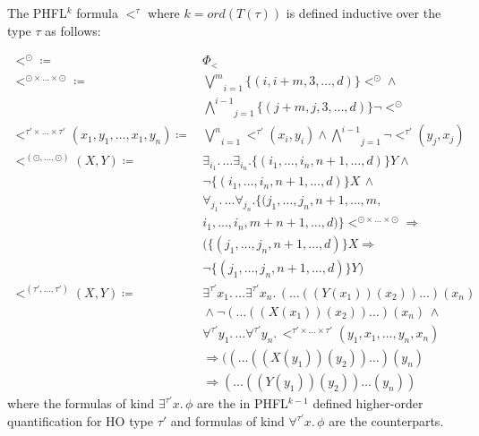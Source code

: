 \begin{definition}
    \label{definition:lower_bound_less}
    The PHFL$^k$ formula $<^\tau$ where $k = ord(T(\tau))$ is defined inductive over the type $\tau$ as follows:

    \begin{align*}
        <^\odot \coloneqq &\,\Phi_< \\
        <^{\odot \times \dots \times \odot} \coloneqq &\,\underset{i = 1}{\overset{m}{\bigvee}}\{(i, i + m, 3, \dots,
        d)\} <^\odot \wedge \\
        &\,\underset{j = 1}{\overset{i - 1}{\bigwedge}}\{(j + m, j, 3, \dots, d)\} \neg
        <^\odot\\
        <^{\tau' \times \dots \times \tau'}(x_1, y_1, \dots, x_1, y_n) \coloneqq &\,\underset{i =
        1}{\overset{n}{\bigvee}}<^{\tau'}(x_i, y_i) \wedge \underset{j = 1}{\overset{i - 1}{\bigwedge}}
        \neg <^{\tau'}(y_j, x_j)\\
        <^{(\odot, \dots, \odot)}(X, Y) \coloneqq &\,\exists_{i_1}.\, \dots \exists_{i_n}. \{(i_1, \dots, i_n, n
        + 1, \dots, d)\}Y \wedge \\&\,\neg \{(i_1, \dots,
        i_n, n + 1, \dots, d)\} X\,\wedge\\&\, \forall_{j_1}. \,\dots \forall_{j_n}. \{(j_1, \dots, j_n, n+1,
        \dots, m, \\&\,i_1, \dots, i_n, m + n + 1, \dots, d)\}<^{\odot
        \times \dots \times \odot} \Rightarrow \\&\,(\{(j_1, \dots, j_n, n + 1, \dots, d)\}X
        \Rightarrow \\&\,\neg \{(j_1, \dots, j_n, n + 1, \dots, d)\} Y)
        \\
        <^{(\tau', \dots, \tau')}(X, Y) \coloneqq &\,\exists^{\tau'}x_1. \,\dots \exists^{\tau'}x_n.\,(\dots((Y
        (x_1))(x_2))
        \dots) (x_n)
         \\&\,\wedge \neg (\dots((X(x_1))(x_2)) \dots)(x_n)\,\wedge \\&\,\forall^{\tau'}y_1. \,\dots
        \forall^{\tau'}y_n.
        \,<^{\tau'
        \times \dots \times \tau'}
        (y_1, x_1, \dots, y_n, x_n) \\&\,\Rightarrow ((\dots((X(y_1))(y_2)) \dots)(y_n) \\&\,\Rightarrow (\dots((Y(y_1))
        (y_2)) \dots(y_n))
    \end{align*}
    where the formulas of kind $\exists^{\tau'} x.\,\phi$ are the in PHFL$^{k-1}$ defined higher-order quantification
    for HO
    type $\tau'$ and formulas of kind $\forall^{\tau'} x.\,\phi$ are the counterparts.
\end{definition}

